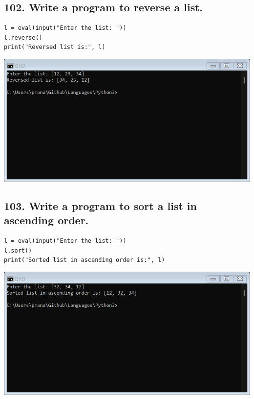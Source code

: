 \documentclass[12pt]{article}
\begin{document}
\subsection*{102. Write a program to reverse a list.}
\begin{verbatim}
l = eval(input("Enter the list: "))
l.reverse()
print("Reversed list is:", l)
\end{verbatim}
\includegraphics[width=\linewidth]{images/102.png}

\subsection*{103. Write a program to sort a list in ascending order.}
\begin{verbatim}
l = eval(input("Enter the list: "))
l.sort()
print("Sorted list in ascending order is:", l)
\end{verbatim}
\includegraphics[width=\linewidth]{images/103.png}
\end{document}
